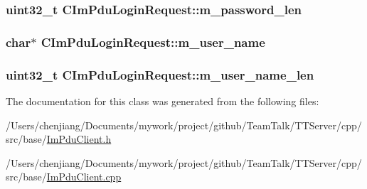 \subsubsection[{m\+\_\+password\+\_\+len}]{\setlength{\rightskip}{0pt plus 5cm}uint32\+\_\+t C\+Im\+Pdu\+Login\+Request\+::m\+\_\+password\+\_\+len\hspace{0.3cm}{\ttfamily [private]}}\label{class_c_im_pdu_login_request_a48fa22ca9a1ecdb23e18d92fe32f32b4}
\hypertarget{class_c_im_pdu_login_request_a5fd10a040ee72540a2a24ba6214b7ca3}{}
\subsubsection[{m\+\_\+user\+\_\+name}]{\setlength{\rightskip}{0pt plus 5cm}char$\ast$ C\+Im\+Pdu\+Login\+Request\+::m\+\_\+user\+\_\+name\hspace{0.3cm}{\ttfamily [private]}}\label{class_c_im_pdu_login_request_a5fd10a040ee72540a2a24ba6214b7ca3}
\hypertarget{class_c_im_pdu_login_request_a387f1bc1dbb83dec505fec6adbb96178}{}
\subsubsection[{m\+\_\+user\+\_\+name\+\_\+len}]{\setlength{\rightskip}{0pt plus 5cm}uint32\+\_\+t C\+Im\+Pdu\+Login\+Request\+::m\+\_\+user\+\_\+name\+\_\+len\hspace{0.3cm}{\ttfamily [private]}}\label{class_c_im_pdu_login_request_a387f1bc1dbb83dec505fec6adbb96178}


The documentation for this class was generated from the following files\+:\begin{DoxyCompactItemize}
\item 
/\+Users/chenjiang/\+Documents/mywork/project/github/\+Team\+Talk/\+T\+T\+Server/cpp/src/base/\hyperlink{_im_pdu_client_8h}{Im\+Pdu\+Client.\+h}\item 
/\+Users/chenjiang/\+Documents/mywork/project/github/\+Team\+Talk/\+T\+T\+Server/cpp/src/base/\hyperlink{_im_pdu_client_8cpp}{Im\+Pdu\+Client.\+cpp}\end{DoxyCompactItemize}
